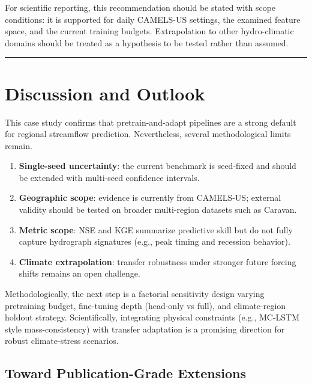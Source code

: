 \documentclass[
]{krantz}
\providecommand{\tightlist}{%
  \setlength{\itemsep}{0pt}\setlength{\parskip}{0pt}}
\begin{document}
For scientific reporting, this recommendation should be stated with scope conditions:
it is supported for daily CAMELS-US settings, the examined feature space, and the
current training budgets. Extrapolation to other hydro-climatic domains should be
treated as a hypothesis to be tested rather than assumed.

\begin{center}\rule{0.5\linewidth}{0.5pt}\end{center}

\section{Discussion and Outlook}\label{nh-discussion}

This case study confirms that pretrain-and-adapt pipelines are a strong default for
regional streamflow prediction. Nevertheless, several methodological limits remain.

\begin{enumerate}
\def\labelenumi{\arabic{enumi}.}
\tightlist
\item
  \textbf{Single-seed uncertainty}: the current benchmark is seed-fixed and should be
  extended with multi-seed confidence intervals.
\item
  \textbf{Geographic scope}: evidence is currently from CAMELS-US; external validity should
  be tested on broader multi-region datasets such as Caravan.
\item
  \textbf{Metric scope}: NSE and KGE summarize predictive skill but do not fully capture
  hydrograph signatures (e.g., peak timing and recession behavior).
\item
  \textbf{Climate extrapolation}: transfer robustness under stronger future forcing shifts
  remains an open challenge.
\end{enumerate}

Methodologically, the next step is a factorial sensitivity design varying pretraining
budget, fine-tuning depth (head-only vs full), and climate-region holdout strategy.
Scientifically, integrating physical constraints (e.g., MC-LSTM style mass-consistency)
with transfer adaptation is a promising direction for robust climate-stress scenarios.

\subsection{Toward Publication-Grade Extensions}\label{toward-publication-grade-extensions}
\end{document}
